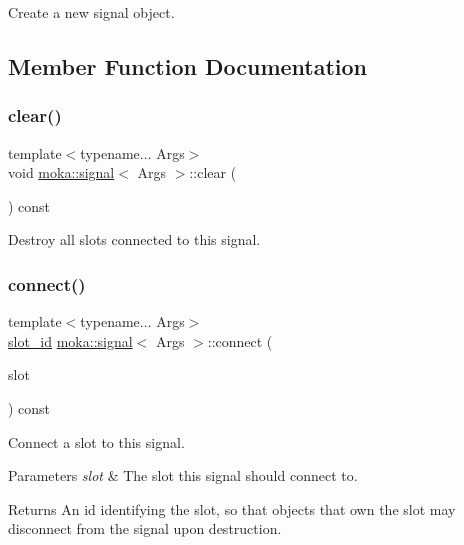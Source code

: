 Create a new signal object. 



\subsection{Member Function Documentation}
\mbox{\label{classmoka_1_1signal_a47b68d9f992a1b17feb7c230a32fdde4}} 
\subsubsection{\texorpdfstring{clear()}{clear()}}
{\footnotesize\ttfamily template$<$typename... Args$>$ \\
void \mbox{\hyperlink{classmoka_1_1signal}{moka\+::signal}}$<$ Args $>$\+::clear (\begin{DoxyParamCaption}{ }\end{DoxyParamCaption}) const}



Destroy all slots connected to this signal. 

\mbox{\label{classmoka_1_1signal_a63de4b64ffe3208549cc7497ec2852b6}} 
\subsubsection{\texorpdfstring{connect()}{connect()}}
{\footnotesize\ttfamily template$<$typename... Args$>$ \\
\mbox{\hyperlink{namespacemoka_a959d3112313fb589684e8b1e3df66385}{slot\+\_\+id}} \mbox{\hyperlink{classmoka_1_1signal}{moka\+::signal}}$<$ Args $>$\+::connect (\begin{DoxyParamCaption}\item[{slot \&\&}]{slot }\end{DoxyParamCaption}) const}



Connect a slot to this signal. 


\begin{DoxyParams}{Parameters}
{\em slot} & The slot this signal should connect to. \\
\hline
\end{DoxyParams}
\begin{DoxyReturn}{Returns}
An id identifying the slot, so that objects that own the slot may disconnect from the signal upon destruction. 
\end{DoxyReturn}
\mbox{\label{classmoka_1_1signal_a69af1b997c17ea3cb311e1b7f3b24bf4}} 
